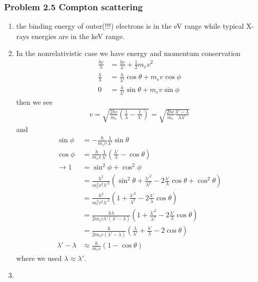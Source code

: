 \documentclass[10pt,a4paper]{article}
\theoremstyle{definition}
\begin{document}
\subsubsection{Problem 2.5 Compton scattering}
\begin{enumerate}
    \item the binding energy of outer(!!!) electrons is in the eV range while typical X-rays energies are in the keV range.
    \item In the nonrelativistic case we have energy and momentum conservation
    \begin{align}
        \frac{hc}{\lambda}&=\frac{hc}{\lambda'}+\frac{1}{2}m_ev^2\\
        \frac{h}{\lambda}&=\frac{h}{\lambda'}\cos\theta+m_ev\cos\phi\\
        0&=\frac{h}{\lambda'}\sin\theta+m_ev\sin\phi
    \end{align}
    then we see
    \begin{align}
        v=\sqrt{\frac{2hc}{m_e}\left(\frac{1}{\lambda}-\frac{1}{\lambda'}\right)}
        =\sqrt{\frac{2hc}{m_e}\frac{\lambda'-\lambda}{\lambda\lambda'}}
    \end{align}
    and
    \begin{align}
        \sin\phi&=-\frac{h}{m_ev}\frac{1}{\lambda'}\sin\theta\\
        \cos\phi&=\frac{h}{m_ev}\frac{1}{\lambda'}\left(\frac{\lambda'}{\lambda}-\cos\theta\right)\\
        \rightarrow1&=\sin^2\phi+\cos^2\phi\\
        &=\frac{h^2}{m_e^2v^2\lambda'^2}\left(\sin^2\theta+\frac{\lambda'^2}{\lambda^2}-2\frac{\lambda'}{\lambda}\cos\theta+\cos^2\theta\right)\\
        &=\frac{h^2}{m_e^2v^2\lambda'^2}\left(1+\frac{\lambda'^2}{\lambda^2}-2\frac{\lambda'}{\lambda}\cos\theta\right)\\
        &=\frac{h\lambda}{2m_ec\lambda'(\lambda'-\lambda)}\left(1+\frac{\lambda'^2}{\lambda^2}-2\frac{\lambda'}{\lambda}\cos\theta\right)\\
        &=\frac{h}{2m_ec(\lambda'-\lambda)}\left(\frac{\lambda}{\lambda'}+\frac{\lambda'}{\lambda}-2\cos\theta\right)\\
        \lambda'-\lambda&\approx\frac{h}{m_ec}\left(1-\cos\theta\right)
    \end{align}
    where we used $\lambda\approx\lambda'$.
    \item 
\end{enumerate}
    
\end{document}
